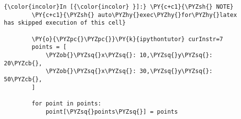     \begin{Verbatim}[commandchars=\\\{\}]
{\color{incolor}In [{\color{incolor} }]:} \PY{c+c1}{\PYZsh{} NOTE}
        \PY{c+c1}{\PYZsh{} auto\PYZhy{}exec\PYZhy{}for\PYZhy{}latex has skipped execution of this cell}
        
        \PY{o}{\PYZpc{}\PYZpc{}}\PY{k}{ipythontutor} curInstr=7
        points = [
            \PYZob{}\PYZsq{}x\PYZsq{}: 10,\PYZsq{}y\PYZsq{}: 20\PYZcb{},
            \PYZob{}\PYZsq{}x\PYZsq{}: 30,\PYZsq{}y\PYZsq{}: 50\PYZcb{},
        ]
        
        for point in points:
            point[\PYZsq{}points\PYZsq{}] = points
\end{Verbatim}



    
    
    
